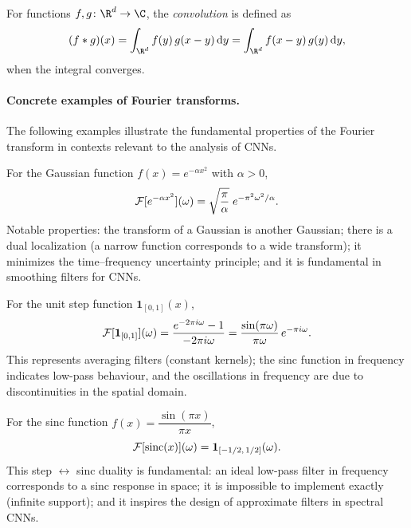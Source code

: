 \begin{definition}[Convolution on $\R^d$]
\label{def:grids:convolucion-continua}
For functions $f, g \colon \R^d \to \C$, the \emph{convolution} is defined as
\[
  (f \conv g)(x) = \int_{\R^d} f(y)\, g(x - y)\, \mathrm{d}y
   = \int_{\R^d} f(x - y)\, g(y)\, \mathrm{d}y,
\]
when the integral converges.
\end{definition}

\paragraph{Concrete examples of Fourier transforms.}
The following examples illustrate the fundamental properties of the Fourier
transform in contexts relevant to the analysis of CNNs.

\begin{example}
\label{ex:grids:fourier-gaussian}
For the Gaussian function $f(x) = e^{-\alpha x^2}$ with $\alpha > 0$,
\[
  \mathcal{F}[e^{-\alpha x^2}](\omega) = \sqrt{\frac{\pi}{\alpha}}\; e^{-\pi^2 \omega^2/\alpha}.
\]
Notable properties: the transform of a Gaussian is another Gaussian; there is a
dual localization (a narrow function corresponds to a wide transform); it
minimizes the time--frequency uncertainty principle; and it is fundamental in
smoothing filters for CNNs.
\end{example}

\begin{example}
\label{ex:grids:fourier-step}
For the unit step function $\mathbf{1}_{[0,1]}(x)$,
\[
  \mathcal{F}[\mathbf{1}_{[0,1]}](\omega)
   = \frac{e^{-2\pi i \omega} - 1}{-2\pi i \omega}
   = \frac{\sin(\pi\omega)}{\pi\omega}\, e^{-\pi i \omega}.
\]
This represents averaging filters (constant kernels); the sinc function in
frequency indicates low-pass behaviour, and the oscillations in frequency are
due to discontinuities in the spatial domain.
\end{example}

\begin{example}
\label{ex:grids:fourier-sinc}
For the sinc function $f(x) = \dfrac{\sin(\pi x)}{\pi x}$,
\[
  \mathcal{F}[\operatorname{sinc}(x)](\omega) = \mathbf{1}_{[-1/2,\,1/2]}(\omega).
\]
This step $\leftrightarrow$ sinc duality is fundamental: an ideal low-pass
filter in frequency corresponds to a sinc response in space; it is impossible to
implement exactly (infinite support); and it inspires the design of approximate
filters in spectral CNNs.
\end{example}

